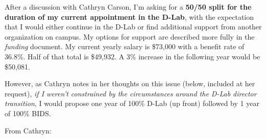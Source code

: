 




After a discussion with Cathryn Carson, I'm asking for a \textbf{50/50 split for
    the duration of my current appointment in the D-Lab}, with the expectation
that I would either continue in the D-Lab or find additional support from
another organization on campus. My options for support are described more fully
in the \emph{funding} document. My current yearly salary is \$73,000 with a
benefit rate of 36.8\%. Half of that total is \$49,932. A 3\% increase
in the following year would be \$50,081.

However, as Cathryn notes in her thoughts on this issue (below, included at her
request), \emph{if I weren't constrained by the circumstances around the D-Lab
director transition}, I would propose one year of 100\% D-Lab (up front) followed
by 1 year of 100\% BIDS.

\vspace{2ex}
\noindent From Cathryn:

